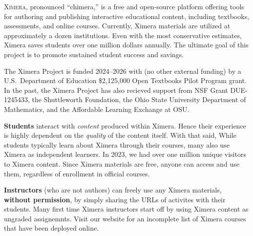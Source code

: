 \documentclass[twocolumn]{article}
\begin{document}
\pagestyle{main}
\thispagestyle{title}
\noindent
\lettrine[lines=2]{X}{imera}, pronounced ``chimera,'' is a free and
open-source platform offering tools for authoring and publishing
interactive educational content, including textbooks, assessments, and
online
courses. Currently, Ximera materials are utilized at approximately a dozen
institutions. Even with the most conservative estimates, Ximera saves
students
over one million dollars annually. The ultimate goal of this project is to
promote sustained student success and savings.

The Ximera Project is funded 2024--2026 with (no other external funding) by
a U.S.\ Department of Education \$2,125,000
Open Textbooks Pilot Program grant. In the past, the Ximera Project has
also recieved support from NSF Grant
DUE-1245433, the Shuttleworth Foundation, the Ohio State University
Department of Mathematics, and the Affordable Learning Exchange at OSU.

\begin{xframe}
    {\sffamily\bfseries Students} interact with \textit{content} produced
    within
    Ximera. Hence their experience is highly dependent on the
    \textit{quality} of
    the content itself. With that said,
    While students typically learn about Ximera through their courses, many
    also use Ximera as independent learners. In 2023, we had over one
    million unique visitors to Ximera content. Since Ximera materials are
    free,
    anyone can access and use them, regardless of enrollment in official
    courses.
\end{xframe}

\begin{xframe}
    {\sffamily\bfseries Instructors} (who are not authors) can freely use
    any Ximera materials,
    \textbf{without permission}, by simply sharing the URLs of activites
    with their students. Many first time Ximera instructors start off by
    using Ximera content as
    ungraded assignemnts. Visit our website for an incomplete list of
    Ximera courses that have been deployed online.
\end{xframe}
\end{document}
